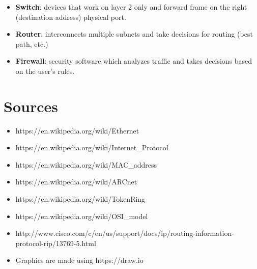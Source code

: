 \documentclass{article}
\begin{document}
\begin{itemize}
		\item \textbf{Switch}: 
			devices that work on layer 2 only and forward frame on the right (destination address) physical port.
			
		\item \textbf{Router}: 
			interconnects multiple subnets and take decisions for routing (best path, etc.)
			
		\item \textbf{Firewall}: 
			security software which analyzes traffic and takes decisions based on the user's rules.
		
	\end{itemize}
	
	\newpage

\section{Sources}
	\begin{itemize}
		\itemsep0em
		\item https://en.wikipedia.org/wiki/Ethernet
		\item https://en.wikipedia.org/wiki/Internet\_Protocol
		\item https://en.wikipedia.org/wiki/MAC\_address
		\item https://en.wikipedia.org/wiki/ARCnet
		\item https://en.wikipedia.org/wiki/TokenRing
		\item https://en.wikipedia.org/wiki/OSI\_model
		\item http://www.cisco.com/c/en/us/support/docs/ip/routing-information-protocol-rip/13769-5.html
		\item Graphics are made using https://draw.io
	\end{itemize}
	
\end{document}
